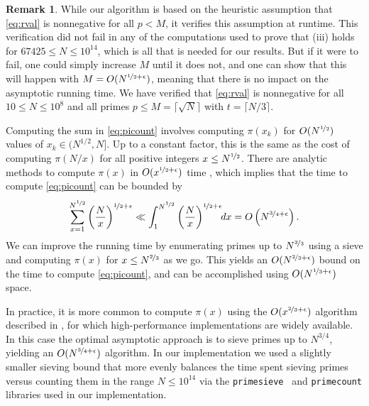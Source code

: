 \documentclass[10pt,a4paper,reqno]{amsart}
\numberwithin{equation}{section}
\theoremstyle{plain}
\theoremstyle{definition}
\newtheorem{remark}[remark]{Remark}
\begin{document}
\begin{remark} While our algorithm is based on the heuristic assumption that \eqref{eq:rval} is nonnegative for all $p<M$, it verifies this assumption at runtime. This verification did not fail in any of the computations used to prove that (iii) holds for $67425\le N\le 10^{14}$, which is all that is needed for our results.  But if it were to fail, one could simply increase $M$ until it does not, and one can show that this will happen with $M=O(N^{\nicefrac{1}{2}+\epsilon})$, meaning that there is no impact on the asymptotic running time.  We have verified that \eqref{eq:rval} is nonnegative for all $10\le N\le 10^8$ and all primes $p \le M=\lceil\sqrt{N}\rceil$ with $t=\lceil N/3\rceil$.
\end{remark}

Computing the sum in \eqref{eq:picount} involves computing $\pi(x_k)$ for $O(N^{\nicefrac{1}{2}})$ values of $x_k\in (N^{1/2},N]$.
Up to a constant factor, this is the same as the cost of computing $\pi(N/x)$ for all positive integers $x \le N^{\nicefrac{1}{2}}$.
There are analytic methods to compute $\pi(x)$ in $O(x^{\nicefrac{1}{2}+\epsilon})$ time \cite{lagarias-odlyzko}, which implies that the time to compute \eqref{eq:picount} can be bounded by
\[
\sum_{x=1}^{N^{\nicefrac{1}{2}}} \left(\frac{N}{x}\right)^{\nicefrac{1}{2}+\epsilon} \ll \int_1^{N^{\nicefrac{1}{2}}} \left(\frac{N}{x}\right)^{\nicefrac{1}{2}+\epsilon}\!\! dx = O\left(N^{\nicefrac{3}{4}+\epsilon}\right).
\]
We can improve the running time by enumerating primes up to $N^{\nicefrac{2}{3}}$ using a sieve and computing $\pi(x)$ for $x\le N^{\nicefrac{2}{3}}$ as we go.  This yields an $O(N^{\nicefrac{2}{3}+\epsilon})$ bound on the time to compute \eqref{eq:picount}, and can be accomplished using $O(N^{\nicefrac{1}{3}+\epsilon})$ space.

In practice, it is more common to compute $\pi(x)$ using the $O(x^{\nicefrac{2}{3}+\epsilon})$ algorithm described in \cite{deleglise-rivat,lagarias-miller-odlyzko}, for which high-performance implementations are widely available.  In this case the optimal asymptotic approach is to sieve primes up to $N^{3/4}$, yielding an $O(N^{\nicefrac{3}{4}+\epsilon})$ algorithm. In our implementation we used a  slightly smaller sieving bound that more evenly balances the time spent sieving primes versus counting them in the range $N\le 10^{14}$ via the \texttt{primesieve}~\cite{walisch-primesieve} and \texttt{primecount} \cite{walisch-primecount} libraries used in our implementation.
\end{document}
